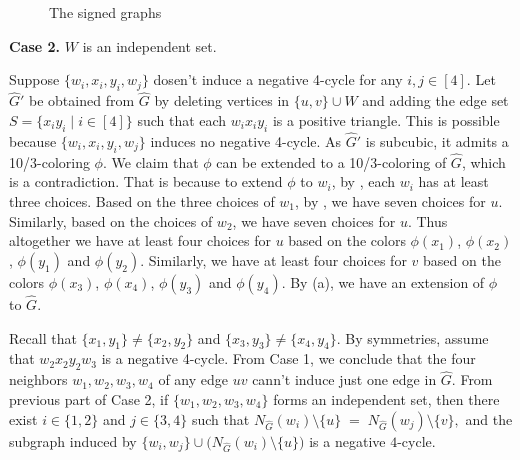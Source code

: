 \documentclass[11pt,a4paper]{article}
\makeatletter
\renewenvironment{proof}[1][\proofname]{\par
	\pushQED{\qed}%
	\normalfont \topsep6\p@\@plus6\p@\relax
	\trivlist
	\item[\hskip\labelsep
	\bfseries
	#1\@addpunct{.}]\ignorespaces
}{%
	\popQED\endtrivlist\@endpefalse
}
\theoremstyle{definition}
\makeatother
\begin{document}
\begin{proof}
\begin{figure}
\begin{minipage}[h]{0.4\textwidth}
	\end{minipage}
	\caption{The signed graphs}
	\label{fig:8vertices}
\end{figure}

	


	\textbf{Case 2.}   $W$ is an independent set. 
	
	Suppose $\{w_{i}, x_{i}, y_{i}, w_{j}\}$ dosen't induce a negative 4-cycle for any $i,j\in [4]$. Let $\widehat{G}'$ be obtained from $\widehat{G}$ by deleting vertices in $\{u,v\}\cup W$ and adding the edge set $S=\{x_iy_i\mid i\in [4] \}$ such that each  $w_ix_iy_i$ is a positive triangle. This is possible because $\{w_{i}, x_{i}, y_{i}, w_{j}\}$  induces no negative 4-cycle. As $\widehat{G}'$ is subcubic, it admits a 10/3-coloring $\phi$. We claim that $\phi$ can be extended to a 10/3-coloring of $\widehat{G}$, which is a contradiction. That is because to extend $\phi$ to $w_i$, by , each $w_i$ has at least three choices. Based on the three choices of $w_1$, by , we have seven choices for $u$. Similarly, based on the choices of $w_2$, we have seven choices for $u$. Thus altogether we have at least four choices for $u$ based on the colors $\phi(x_1)$,  $\phi(x_2)$, $\phi(y_1)$ and $\phi(y_2)$. Similarly, we have at least four choices for $v$ based on the colors $\phi(x_3)$,  $\phi(x_4)$, $\phi(y_3)$ and $\phi(y_4)$. By (a), we have an extension of $\phi$ to $\widehat{G}$.
		
Recall that $\{x_{1}, y_{1}\} \neq \{x_{2}, y_{2}\}$ and $\{x_{3}, y_{3}\} \neq \{x_{4}, y_{4}\}$.  By symmetries, assume that $w_{2}x_{2}y_{2}w_{3}$ is a negative 4-cycle. From Case 1, we conclude that the four neighbors $w_{1},w_{2},w_{3},w_{4}$ of any edge $uv$ cann't induce just one edge in $\widehat{G}$. From previous part of Case 2,  if $\{w_{1},w_{2},w_{3},w_{4}\}$ forms an independent set, then there exist $i \in \{1,2\}$ and $j \in \{3,4\}$ such that $N_{\widehat{G}}(w_{i}) \setminus \{u\} \;=\; N_{\widehat{G}}(w_{j}) \setminus \{v\},$ and the subgraph induced by $\{w_{i},w_{j}\} \cup \bigl(N_{\widehat{G}}(w_{i}) \setminus \{u\}\bigr)$ is a negative $4$-cycle.


\end{proof}
\end{document}
